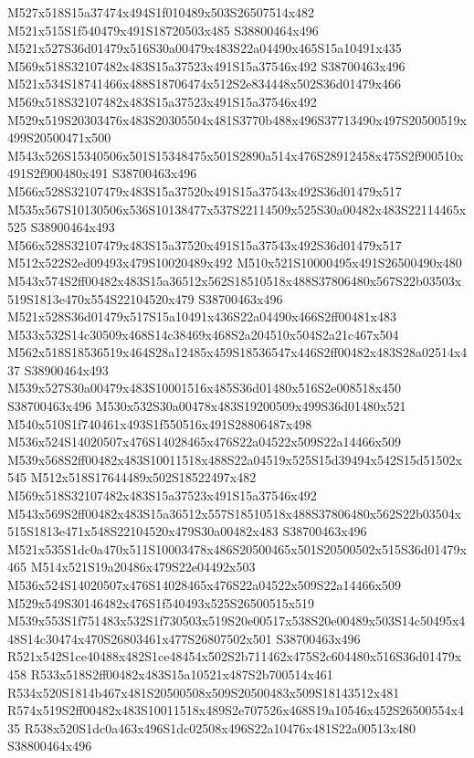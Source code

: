 \documentclass{article}
\begin{document}
\begin{multicols}{2}


M527x518S15a37474x494S1f010489x503S26507514x482 M521x515S1f540479x491S18720503x485 S38800464x496 M521x527S36d01479x516S30a00479x483S22a04490x465S15a10491x435 M569x518S32107482x483S15a37523x491S15a37546x492 S38700463x496 M521x534S18741466x488S18706474x512S2e834448x502S36d01479x466 M569x518S32107482x483S15a37523x491S15a37546x492 M529x519S20303476x483S20305504x481S3770b488x496S37713490x497S20500519x499S20500471x500 M543x526S15340506x501S15348475x501S2890a514x476S28912458x475S2f900510x491S2f900480x491 S38700463x496 M566x528S32107479x483S15a37520x491S15a37543x492S36d01479x517 M535x567S10130506x536S10138477x537S22114509x525S30a00482x483S22114465x525 S38900464x493 M566x528S32107479x483S15a37520x491S15a37543x492S36d01479x517 M512x522S2ed09493x479S10020489x492 M510x521S10000495x491S26500490x480 M543x574S2ff00482x483S15a36512x562S18510518x488S37806480x567S22b03503x519S1813e470x554S22104520x479 S38700463x496 M521x528S36d01479x517S15a10491x436S22a04490x466S2ff00481x483 M533x532S14c30509x468S14c38469x468S2a204510x504S2a21c467x504 M562x518S18536519x464S28a12485x459S18536547x446S2ff00482x483S28a02514x437 S38900464x493 M539x527S30a00479x483S10001516x485S36d01480x516S2e008518x450 S38700463x496 M530x532S30a00478x483S19200509x499S36d01480x521 M540x510S1f740461x493S1f550516x491S28806487x498 M536x524S14020507x476S14028465x476S22a04522x509S22a14466x509 M539x568S2ff00482x483S10011518x488S22a04519x525S15d39494x542S15d51502x545 M512x518S17644489x502S18522497x482 M569x518S32107482x483S15a37523x491S15a37546x492 M543x569S2ff00482x483S15a36512x557S18510518x488S37806480x562S22b03504x515S1813e471x548S22104520x479S30a00482x483 S38700463x496 M521x535S1dc0a470x511S10003478x486S20500465x501S20500502x515S36d01479x465 M514x521S19a20486x479S22e04492x503 M536x524S14020507x476S14028465x476S22a04522x509S22a14466x509 M529x549S30146482x476S1f540493x525S26500515x519 M539x553S1f751483x532S1f730503x519S20e00517x538S20e00489x503S14c50495x448S14c30474x470S26803461x477S26807502x501 S38700463x496 R521x542S1ce40488x482S1ce48454x502S2b711462x475S2c604480x516S36d01479x458 R533x518S2ff00482x483S15a10521x487S2b700514x461 R534x520S1814b467x481S20500508x509S20500483x509S18143512x481 R574x519S2ff00482x483S10011518x489S2e707526x468S19a10546x452S26500554x435 R538x520S1dc0a463x496S1dc02508x496S22a10476x481S22a00513x480 S38800464x496


\end{multicols}
\end{document}
